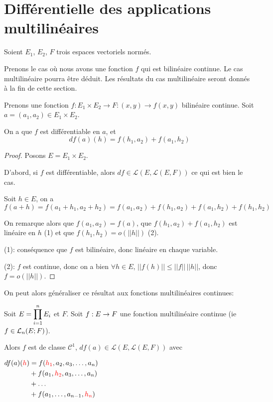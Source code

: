 \section{Différentielle des applications multilinéaires}

Soient $E_{1}$, $E_{2}$, $F$ trois espaces vectoriels normés.

Prenons le cas où nous avons une fonction $f$ qui est bilinéaire continue. Le cas
multilinéaire pourra être déduit. Les résultats du cas multilinéaire seront
donnés à la fin de cette section.

\begin{proposition}
	\label{bilinear_differential_application}
	Prenons une fonction $f : E_{1} \times E_{2} \rightarrow F : (x, y) \rightarrow
	f(x, y)$ bilinéaire continue. Soit $a = (a_{1}, a_{2}) \in E_{1} \times E_{2}$.

	On a que $f$ est différentiable en $a$, et
	\begin{equation*}
		df(a)(h) = f(h_{1}, a_{2}) + f(a_{1}, h_{2})
	\end{equation*}
\end{proposition}

\ifdefined\outputproof
\begin{proof}
	Posons $E = E_{1} \times E_{2}$.

	D'abord, si $f$ est différentiable, alors $df \in
	\mathcal{L}(E, \mathcal{L}(E, F))$ ce qui est bien
	le cas.

	Soit $h \in E$, on a
	$f(a + h) = f(a_{1} + h_{1}, a_{2} + h_{2}) =
	f(a_{1}, a_{2}) + f(h_{1}, a_{2}) + f(a_{1}, h_{2}) + f(h_{1}, h_{2})$

	On remarque alors que $f(a_{1}, a_{2}) = f(a)$, que $f(h_{1}, a_{2}) +
	f(a_{1}, h_{2})$ est linéaire en $h$ (1) et que $f(h_{1}, h_{2}) = o(||h||)$
	(2).

	(1): conséquence que $f$ est bilinéaire, donc linéaire en chaque variable.

	(2): $f$ est continue, donc on a bien $\forall h \in E$, $||f(h)|| \leq
	||f|| \, ||h||$, donc $f = o(||h||)$.
\end{proof}
\fi

On peut alors généraliser ce résultat aux fonctions multilinéaires continues:

\begin{proposition}
	\label{proposition:multilinear_differential_application}
	Soit $E = \GSprodSet{i}{1}{n}{E}$ et $F$.
	Soit $\GSfunction{f}{E}{F}$ une fonction multilinéaire continue (ie $f \in
	\GScontinueHomo[n]{E}{F}$).

	Alors $f$ est de classe $\mathcal{C}^{1}$,
	$df(a) \in \mathcal{L}(E, \mathcal{L}(E, F))$ avec

	$
	\begin{aligned}
		df(a)(\textcolor{red}{h})
	&=	f(\textcolor{red}{h_{1}}, a_{2}, a_{3}, \ldots, a_{n}) \\
	&+	f(a_{1}, \textcolor{red}{h_{2}}, a_{3}, \ldots, a_{n}) \\
	&+	\ldots \\
	&+	f(a_{1}, \ldots, a_{n-1}, \textcolor{red}{h_{n}})
	\end{aligned}
	$
\end{proposition}

